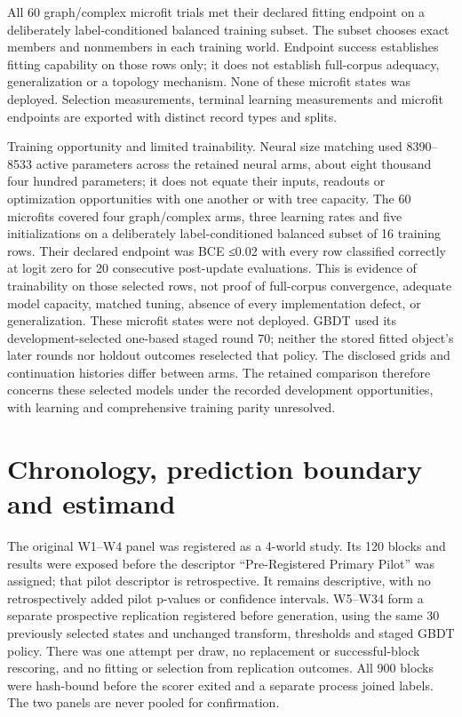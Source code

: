 \documentclass{article}
\begin{document}
All 60 graph/complex microfit trials met their declared fitting endpoint on a deliberately label-conditioned balanced training subset. The subset chooses exact members and nonmembers in each training world. Endpoint success establishes fitting capability on those rows only; it does not establish full-corpus adequacy, generalization or a topology mechanism. None of these microfit states was deployed. Selection measurements, terminal learning measurements and microfit endpoints are exported with distinct record types and splits.

Training opportunity and limited trainability. Neural size matching used 8390–8533 active parameters across the retained neural arms, about eight thousand four hundred parameters; it does not equate their inputs, readouts or optimization opportunities with one another or with tree capacity. The 60 microfits covered four graph/complex arms, three learning rates and five initializations on a deliberately label-conditioned balanced subset of 16 training rows. Their declared endpoint was BCE ≤0.02 with every row classified correctly at logit zero for 20 consecutive post-update evaluations. This is evidence of trainability on those selected rows, not proof of full-corpus convergence, adequate model capacity, matched tuning, absence of every implementation defect, or generalization. These microfit states were not deployed. GBDT used its development-selected one-based staged round 70; neither the stored fitted object's later rounds nor holdout outcomes reselected that policy. The disclosed grids and continuation histories differ between arms. The retained comparison therefore concerns these selected models under the recorded development opportunities, with learning and comprehensive training parity unresolved.

\section{Chronology, prediction boundary and estimand}

The original W1--W4 panel was registered as a 4-world study. Its 120 blocks and results were exposed before the descriptor ``Pre-Registered Primary Pilot'' was assigned; that pilot descriptor is retrospective. It remains descriptive, with no retrospectively added pilot p-values or confidence intervals. W5--W34 form a separate prospective replication registered before generation, using the same 30 previously selected states and unchanged transform, thresholds and staged GBDT policy. There was one attempt per draw, no replacement or successful-block rescoring, and no fitting or selection from replication outcomes. All 900 blocks were hash-bound before the scorer exited and a separate process joined labels. The two panels are never pooled for confirmation.
\end{document}
